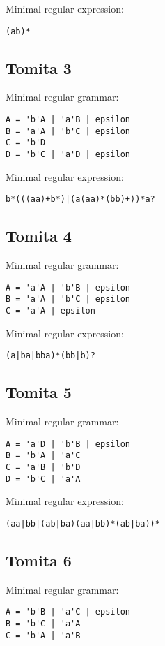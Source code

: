 \documentclass[runningheads]{llncs}
\begin{document}
Minimal regular expression:
\begin{verbatim}
(ab)*
\end{verbatim}

\subsection{Tomita 3}
\label{sec:org63413de}
Minimal regular grammar:
\begin{verbatim}
A = 'b'A | 'a'B | epsilon
B = 'a'A | 'b'C | epsilon
C = 'b'D
D = 'b'C | 'a'D | epsilon
\end{verbatim}

Minimal regular expression:
\begin{verbatim}
b*(((aa)+b*)|(a(aa)*(bb)+))*a?
\end{verbatim}

\subsection{Tomita 4}
\label{sec:org95fb9c1}
Minimal regular grammar:
\begin{verbatim}
A = 'a'A | 'b'B | epsilon
B = 'a'A | 'b'C | epsilon
C = 'a'A | epsilon
\end{verbatim}

Minimal regular expression:
\begin{verbatim}
(a|ba|bba)*(bb|b)?
\end{verbatim}

\subsection{Tomita 5}
\label{sec:org5247868}
Minimal regular grammar:
\begin{verbatim}
A = 'a'D | 'b'B | epsilon
B = 'b'A | 'a'C
C = 'a'B | 'b'D
D = 'b'C | 'a'A
\end{verbatim}

Minimal regular expression:
\begin{verbatim}
(aa|bb|(ab|ba)(aa|bb)*(ab|ba))*
\end{verbatim}

\subsection{Tomita 6}
\label{sec:org388d7c3}
Minimal regular grammar:
\begin{verbatim}
A = 'b'B | 'a'C | epsilon
B = 'b'C | 'a'A
C = 'b'A | 'a'B
\end{verbatim}
\end{document}
